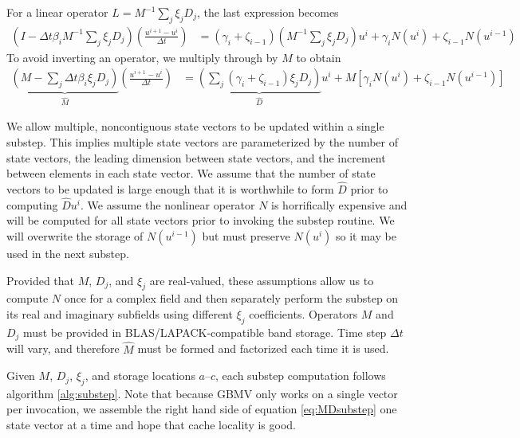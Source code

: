 \documentclass[letterpaper,reqno,11pt]{amsart}
\begin{document}
For a linear operator $L=M^{-1} \sum_{j} \xi_j D_{j}$, the last expression
becomes
\begin{align}
  \left(I-\Delta{}t\beta_{i}M^{-1}\sum_{j}\xi_{j}D_{j}\right)
  \left(\frac{u^{i+1} - u^{i}}{\Delta{}t}\right)
  &=
    \left(\gamma_i+\zeta_{i-1}\right)
      \left(M^{-1}\sum_{j}\xi_{j}D_{j}\right) u^i
  + \gamma_{i} N\left( u^{i} \right)
  + \zeta_{i-1} N\left( u^{i-1} \right)
\end{align}
To avoid inverting an operator, we multiply through by $M$ to obtain
\begin{align}
  \underbrace{
    \left(M-\sum_{j}\Delta{}t\beta_{i}\xi_{j}D_{j}\right)
  }_{\hat{M}}
  \left(\frac{u^{i+1} - u^{i}}{\Delta{}t}\right)
  &=
    \underbrace{
      \left(\sum_{j}\left(\gamma_i+\zeta_{i-1}\right)\xi_{j}D_{j}\right)
    }_{\hat{D}} u^i
  + M \left[
        \gamma_{i} N\left( u^{i} \right)
      + \zeta_{i-1} N\left( u^{i-1} \right)
    \right]
  \label{eq:MDsubstep}
\end{align}

We allow multiple, noncontiguous state vectors to be updated within a single
substep.  This implies multiple state vectors are parameterized by the number
of state vectors, the leading dimension between state vectors, and the
increment between elements in each state vector.  We assume that the number of
state vectors to be updated is large enough that it is worthwhile to form
$\hat{D}$ prior to computing $\hat{D}u^{i}$.  We assume the nonlinear operator
$N$ is horrifically expensive and will be computed for all state vectors prior
to invoking the substep routine.  We will overwrite the storage of $N\left(
u^{i-1} \right)$ but must preserve $N\left( u^i \right)$ so it may be used in
the next substep.

Provided that $M$, $D_j$, and $\xi_j$ are real-valued, these assumptions allow
us to compute $N$ once for a complex field and then separately perform the
substep on its real and imaginary subfields using different $\xi_j$
coefficients.  Operators $M$ and $D_j$ must be provided in
BLAS/LAPACK-compatible band storage.  Time step $\Delta{}t$ will vary, and
therefore $\hat{M}$ must be formed and factorized each time it is used.

Given $M$, $D_j$, $\xi_j$, and storage locations $a$--$c$, each
substep computation follows algorithm \ref{alg:substep}.  Note that because
GBMV only works on a single vector per invocation, we assemble the right hand
side of equation \eqref{eq:MDsubstep} one state vector at a time and hope that
cache locality is good.
\end{document}
